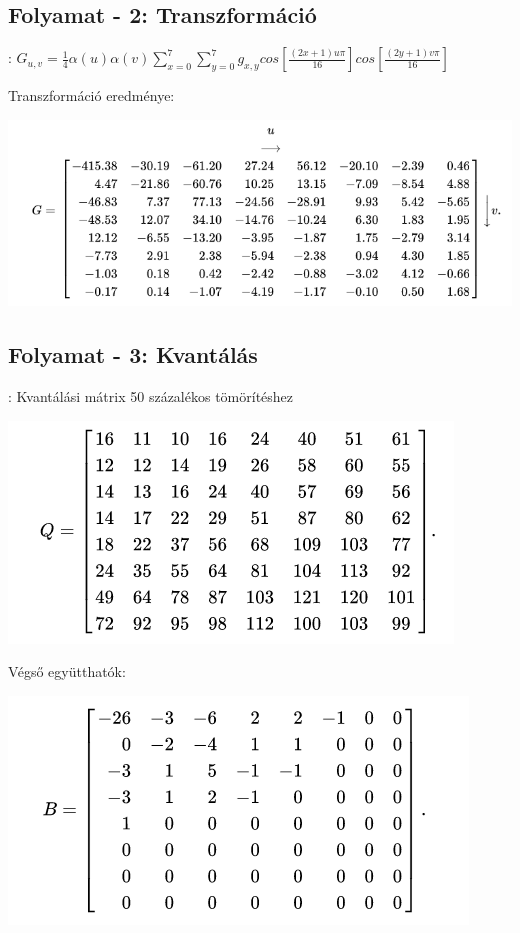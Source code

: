 \documentclass{beamer}
\begin{document}
\subsection{Folyamat - 2: Transzformáció}
\begin{frame}{\secname : \subsecname}
$ G_{u, v} = \frac{1}{4} \alpha(u) \alpha(v) \sum_{x=0}^{7}\sum_{y=0}^{7} g_{x, y} cos[\frac{(2x + 1) u \pi}{16}] cos[\frac{(2y + 1) v \pi}{16}]$


Transzformáció eredménye:

\includegraphics[scale=0.4]{figures/DCT_transformed.png}

\end{frame}

\subsection{Folyamat - 3: Kvantálás}
\begin{frame}{\secname : \subsecname}
\centering
Kvantálási mátrix 50 százalékos tömörítéshez

\includegraphics[scale=0.4]{figures/DCT_quant_50.png}

Végső együtthatók:

\includegraphics[scale=0.4]{figures/DCT_result.png}
\end{frame}
\end{document}
